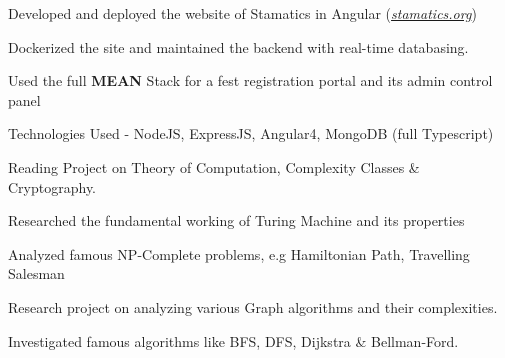\documentclass[]{deedy-resume-openfont}
\begin{document}
\begin{minipage}[t]{0.70\textwidth}
\begin{tightemize}
  \item Developed and deployed the website of Stamatics in Angular (\href{http://stamatics.org}{\textit{stamatics.org}})
  \item Dockerized the site and maintained the backend with real-time databasing.
\end{tightemize}
\begin{tightemize}
  \item Used the full \textbf{MEAN} Stack for a fest registration portal and its admin control panel
  \item Technologies Used - NodeJS, ExpressJS, Angular4, MongoDB (full Typescript)
\end{tightemize}

\begin{tightemize}
  \item Reading Project on Theory of Computation, Complexity Classes \& Cryptography.
  \item Researched the fundamental working of Turing Machine and its properties
  \item Analyzed famous NP-Complete problems, e.g Hamiltonian Path, Travelling Salesman  
\end{tightemize}

\begin{tightemize}
  \item Research project on analyzing various Graph algorithms and their complexities.
  \item Investigated famous algorithms like BFS, DFS, Dijkstra \& Bellman-Ford.
\end{tightemize}

\vspace{-0.3cm}

\end{minipage}
\end{document}
